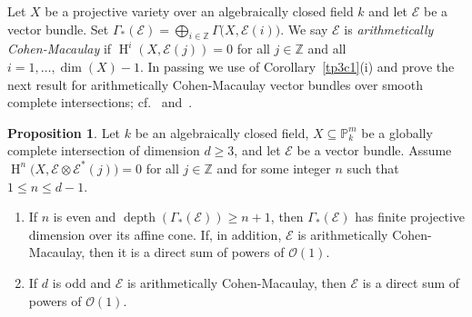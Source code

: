 \documentclass[11pt]{amsart}
\theoremstyle{definition}
\newtheorem{prop}[thm]{Proposition}
\theoremstyle{definition}
\numberwithin{equation}{section}
\newcommand{\ZZ}{\mathbb{Z}}
\DeclareMathOperator{\depth}{depth}
\DeclareMathOperator{\hh}{H}
\begin{document}
Let $X$ be a projective variety over an algebraically closed field $k$ and let $\mathcal{E}$ be a vector bundle. Set $\Gamma_\ast(\mathcal{E})=\bigoplus_{i\in\mathbb{Z}}\Gamma \big(X, \mathcal{E} (i)\big)$. We say $ \mathcal{E}$ is \emph{arithmetically Cohen-Macaulay} if $\hh^i\left(X, \mathcal{E}(j)\right)=0$ for all $j\in \mathbb{Z}$ and all $i = 1, \ldots , \dim(X)-1$. In passing we use of Corollary~\ref{tp3c1}(i) and prove the next result for arithmetically Cohen-Macaulay vector bundles over smooth complete intersections; cf.~\cite[1.2]{KC} and~\cite[1.5]{Da3}.
  
\begin{prop}\label{artCM} Let $k$ be an algebraically closed field, $X\subseteq \mathbb{P}^m_k$ be a globally complete intersection of dimension $d\geq3$, and let $\mathcal{E}$ be a vector bundle. Assume $\hh^{n}\big(X, \mathcal{E}\otimes\mathcal{E}^*(j)\big)=0$ for all $j\in\ZZ$ and for some integer $n$ such that $1\leq n\leq d-1$. 
\begin{enumerate}[\rm(i)]
\item If $n$ is even and $\depth\left(\Gamma_\ast(\mathcal{E})\right)\geq n+1$, then $\Gamma_\ast(\mathcal{E})$ has finite projective dimension over its affine cone. If, in addition, $\mathcal{E}$ is arithmetically Cohen-Macaulay, then it is a direct sum of powers of $\mathcal{O}(1)$.
\item If $d$ is odd and $\mathcal{E}$ is arithmetically Cohen-Macaulay, then $\mathcal{E}$ is a direct sum of powers of $\mathcal{O}(1)$.
\end{enumerate} 
\end{prop}
\end{document}
